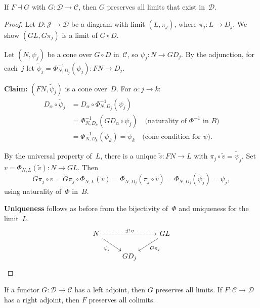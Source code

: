 \begin{theorem}%
\label{thm:radj-preserve-lim}
If $F\dashv G$ with $G\colon\mathcal{D}\to\mathcal{C}$,
then $G$ preserves all limits that exist in~$\mathcal{D}$.
\end{theorem}

\begin{proof}
Let $D\colon\mathcal{J}\to\mathcal{D}$ be a diagram with limit
$(L,\pi_j)$, where $\pi_j\colon L\to D_j$.
We show $(GL,G\pi_j)$ is a limit of $G\circ D$.

Let $(N,\psi_j)$ be a cone over $G\circ D$ in~$\mathcal{C}$,
so $\psi_j\colon N\to GD_j$.
By the adjunction, for each~$j$ let
$\tilde\psi_j = \Phi^{-1}_{N,D_j}(\psi_j)\colon FN\to D_j$.

\textbf{Claim:} $(FN,\tilde\psi_j)$ is a cone over~$D$.
For $\alpha\colon j\to k$:
\begin{align*}
D_\alpha\circ\tilde\psi_j
&= D_\alpha\circ\Phi^{-1}_{N,D_j}(\psi_j) \\
&= \Phi^{-1}_{N,D_k}(GD_\alpha\circ\psi_j)
  \quad\text{(naturality of $\Phi^{-1}$ in $B$)} \\
&= \Phi^{-1}_{N,D_k}(\psi_k) = \tilde\psi_k
  \quad\text{(cone condition for $\psi$)}.
\end{align*}

By the universal property of~$L$, there is a unique
$\tilde v\colon FN\to L$ with $\pi_j\circ\tilde v = \tilde\psi_j$.
Set $v = \Phi_{N,L}(\tilde v)\colon N\to GL$.  Then
\[
    G\pi_j\circ v = G\pi_j\circ\Phi_{N,L}(\tilde v)
    = \Phi_{N,D_j}(\pi_j\circ\tilde v)
    = \Phi_{N,D_j}(\tilde\psi_j) = \psi_j,
\]
using naturality of~$\Phi$ in~$B$.

\textbf{Uniqueness} follows as before from the bijectivity of~$\Phi$
and uniqueness for the limit~$L$.
\[
\begin{tikzcd}
N \arrow[dr, "\psi_j"'] \arrow[rr, dashed, "\exists!\, v"]
& & GL \arrow[dl, "G\pi_j"] \\
& GD_j &
\end{tikzcd}
\]
\end{proof}

\begin{corollary}\label{cor:limits-detect-adjoints}
If a functor $G\colon\mathcal{D}\to\mathcal{C}$ has a left adjoint,
then $G$ preserves all limits.
If $F\colon\mathcal{C}\to\mathcal{D}$ has a right adjoint,
then $F$ preserves all colimits.
\end{corollary}

